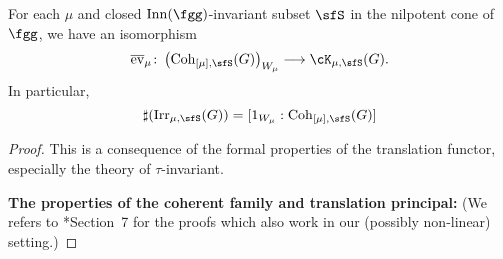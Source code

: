 \documentclass[counting_main.tex]{subfiles}
\begin{document}
\begin{lem}\label{lem:coh.count}
  For each $\mu$ and closed $\Inn(\fgg)$-invariant subset $\sfS$ in the
  nilpotent cone of $\fgg$, we have an isomorphism
  \[
    \bev{\mu}\colon \left(\Coh_{[\mu],\sfS}(G)\right)_{W_{\mu}} \longrightarrow \Grt_{\mu,\sfS}(G).
  \]
  In particular,
  \[
    \sharp(\Irr_{\mu,\sfS}(G)) = [1_{W_{\mu}}:\Coh_{[\mu],\sfS}(G)]
  \]
\end{lem}
\begin{proof}
  This is a consequence of the formal properties of the translation functor,
  especially the theory of $\tau$-invariant.

  \def\Parm{\mathrm{Parm}} \def\cof{\Theta}

  {\bf The properties of the coherent family and translation principal:} (We
  refers to \cite{Vg}*{Section~7} for the proofs which also work in our
  (possibly non-linear) setting.)


\end{proof}
\end{document}
